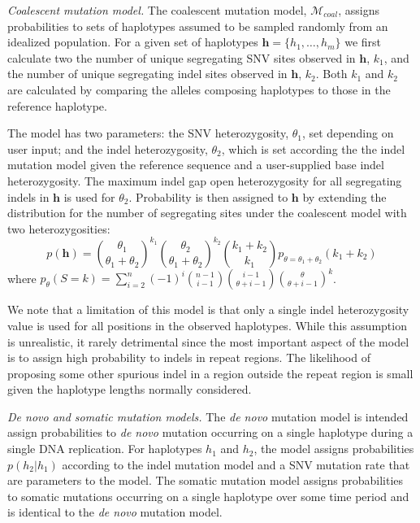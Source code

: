 \documentclass[notitlepage, twocolumn, 10pt]{article}
\begin{document}
\vspace{3mm}
\noindent\emph{Coalescent mutation model.} The coalescent mutation model, $\mathcal{M}_{coal}$, assigns probabilities to sets of haplotypes assumed to be sampled randomly from an idealized population. For a given set of haplotypes ${\boldsymbol{h} = \{h_1, \dots, h_m\}}$ we first calculate two the number of unique segregating SNV sites observed in $\boldsymbol{h}$, $k_1$, and the number of unique segregating indel sites observed in $\boldsymbol{h}$,  $k_2$. Both $k_1$ and $k_2$ are calculated by comparing the alleles composing haplotypes to those in the reference haplotype. 

The model has two parameters: the SNV heterozygosity, $\theta_1$, set depending on user input; and the indel heterozygosity, $\theta_2$, which is set according the the indel mutation model given the reference sequence and a user-supplied base indel heterozygosity. The maximum indel gap open heterozygosity for all segregating indels in $\boldsymbol{h}$ is used for $\theta_2$. Probability is then assigned to $\boldsymbol{h}$ by extending the distribution for the number of segregating sites under the coalescent model \cite{RN622} with two heterozygosities:
\begin{equation*}
    p(\boldsymbol{h}) = \binom{\theta_1}{\theta_1 + \theta_2}^{k_1} \binom{\theta_2}{\theta_1 + \theta_2}^{k_2} \binom{k_1 + k_2}{k_1} p_{\theta = \theta_1 + \theta_2} (k_1 + k_2)
\end{equation*}
where $p_\theta(S = k) = \sum_{i=2}^n (-1)^i \binom{n - 1}{i - 1} \binom{i - 1}{\theta + i - 1} \binom{\theta}{\theta + i - 1}^k$.

We note that a limitation of this model is that only a single indel heterozygosity value is used for all positions in the observed haplotypes. While this assumption is unrealistic, it rarely detrimental since the most important aspect of the model is to assign high probability to indels in repeat regions. The likelihood of proposing some other spurious indel in a region outside the repeat region is small given the haplotype lengths normally considered.

\vspace{3mm}
\noindent\emph{De novo and somatic mutation models.} The \textit{de novo} mutation model is intended assign probabilities to \textit{de novo} mutation occurring on a single haplotype during a single DNA replication. For haplotypes $h_1$ and $h_2$, the model assigns probabilities $p(h_2 | h_1)$ according to the indel mutation model and a SNV mutation rate that are parameters to the model. The somatic mutation model assigns probabilities to somatic mutations occurring on a single haplotype over some time period and is identical to the \textit{de novo} mutation model.
\end{document}
